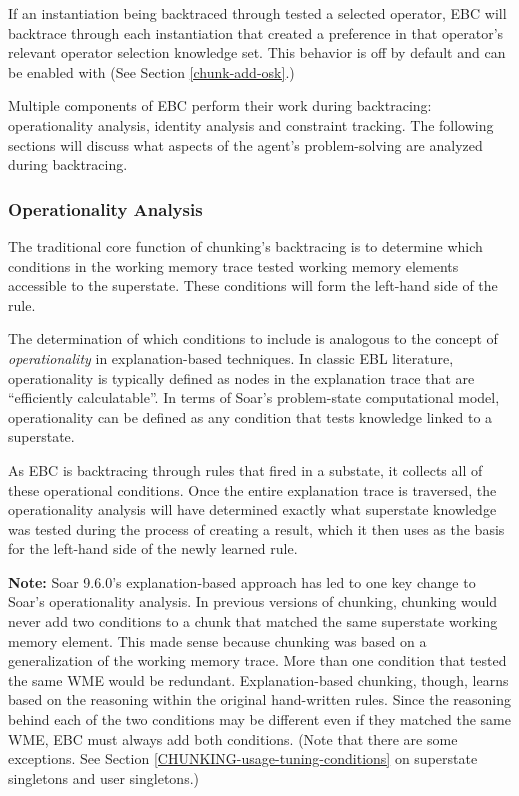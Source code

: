 If an instantiation being backtraced through tested a selected operator, EBC will backtrace through each instantiation that created a preference in that operator's relevant operator selection knowledge set.  This behavior is off by default and can be enabled with  (See Section \ref{chunk-add-osk}.)

Multiple components of EBC perform their work during backtracing:  operationality analysis, identity analysis and constraint tracking.  The following sections will discuss what aspects of the agent's problem-solving are analyzed during backtracing.

\subsubsection{Operationality Analysis}
\label{CHUNKING-during-backtracing-operationality}

The traditional core function of chunking's backtracing is to determine which conditions in the working memory trace tested working memory elements accessible to the superstate.  These conditions will form the left-hand side of the rule.

The determination of which conditions to include is analogous to the concept of \textit{operationality} in explanation-based techniques. In classic EBL literature, operationality is typically defined as nodes in the explanation trace that are ``efficiently calculatable''.  In terms of Soar's problem-state computational model, operationality can be defined as any condition that tests knowledge linked to a superstate.  

As EBC is backtracing through rules that fired in a substate, it collects all of these operational conditions. Once the entire explanation trace is traversed, the operationality analysis will have determined exactly what superstate knowledge was tested during the process of creating a result, which it then uses as the basis for the left-hand side of the newly learned rule.  

\textbf{Note:} Soar 9.6.0's explanation-based approach has led to one key change to Soar's operationality analysis.  In previous versions of chunking, chunking would never add two conditions to a chunk that matched the same superstate working memory element.  This made sense because chunking was based on a generalization of the working memory trace.  More than one condition that tested the same WME would be redundant.  Explanation-based chunking, though, learns based on the reasoning within the original hand-written rules.  Since the reasoning behind each of the two conditions may be different even if they matched the same WME, EBC must always add both conditions.  (Note that there are some exceptions. See Section \ref{CHUNKING-usage-tuning-conditions} on superstate singletons and user singletons.)

